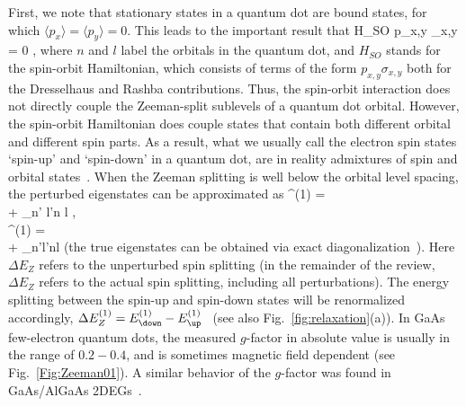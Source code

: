 \documentclass[12pt,aps,nofootinbib]{revtex4-1}
\begin{document}
First, we note that stationary states in a quantum dot are bound
states, for which $\langle p_x \rangle = \langle p_y \rangle = 0$.
This leads to the important result that 
\be 
{} H_{SO}  
\propto {} p_{x,y}  \bra{\down} \sigma_{x,y} \ket{\up} = 0 \;, 
\ee 
where $n$ and $l$ label the orbitals in
the quantum dot, and 
$H_{SO}$ stands for the spin-orbit Hamiltonian, which consists of terms of the form $p_{x,y} \sigma_{x,y}$ both for the Dresselhaus and Rashba contributions. Thus, the spin-orbit
interaction does not directly couple the Zeeman-split
sublevels of a quantum dot orbital. However, the spin-orbit 
Hamiltonian does couple states that contain both different orbital 
and different spin parts\cite{khaetskii00}. As a result, what we
usually call the electron spin states `spin-up' and `spin-down' in
a quantum dot, are in reality admixtures of spin and orbital
states~\cite{khaetskii01}. When the Zeeman splitting is well below
the orbital level spacing, the perturbed eigenstates can be
approximated as \bea
{}^{(1)} =  \hspace*{3.5cm} \nonumber \\
 + \sum_{n' l'\neq n l}
  \;, \hspace*{-.5cm}
\label{eq:SO_zeeman}
\\
^{(1)} =   \hspace*{3.5cm} \nonumber\\
+ \sum_{n'l'\neq nl}  
\hspace*{-.5cm} \label{eq:SO_zeeman2} 
\eea 
(the true eigenstates can be obtained via exact
diagonalization~\cite{cheng04}). Here $\Delta E_Z$ refers to the unperturbed spin splitting (in the remainder of the review, $\Delta E_Z$ refers to the actual spin splitting, including all perturbations). The energy splitting between the spin-up and spin-down states will be renormalized accordingly, $\Delta E_Z^{(1)} = E_\down^{(1)} - E_\up^{(1)}$~\cite{sousa03b,stano05} (see also Fig.~\ref{fig:relaxation}(a)). In GaAs few-electron quantum dots, the measured $g$-factor in absolute value is usually in the range of $0.2 - 0.4$, and is sometimes magnetic field dependent (see Fig.~\ref{Fig:Zeeman01}). A similar behavior of the $g$-factor was found in GaAs/AlGaAs 2DEGs~\cite{dobers88}.
\end{document}
